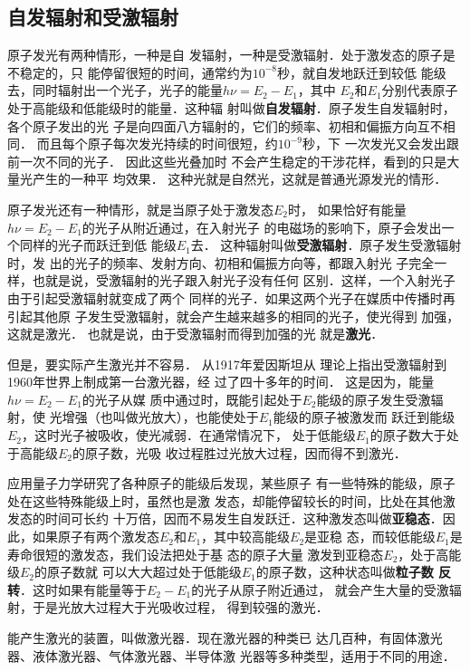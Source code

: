 \subsection{自发辐射和受激辐射}

原子发光有两种情形，一种是自
发辐射，一种是受激辐射．处于激发态的原子是不稳定的，只
能停留很短的时间，通常约为$10^{-8}$秒，就自发地跃迁到较低
能级去，同时辐射出一个光子，光子的能量$h\nu =E_2-E_1$，其中
$E_2$和$E_1$分别代表原子处于高能级和低能级时的能量．这种辐
射叫做\textbf{自发辐射}．原子发生自发辐射时，各个原子发出的光
子是向四面八方辐射的，它们的频率、初相和偏振方向互不相同．
而且每个原子每次发光持续的时间很短，约$10^{-9}$秒，下
一次发光又会发出跟前一次不同的光子．
因此这些光叠加时
不会产生稳定的干涉花样，看到的只是大量光产生的一种平
均效果．
这种光就是自然光，这就是普通光源发光的情形．

原子发光还有一种情形，就是当原子处于激发态$E_2$时，
如果恰好有能量$h\nu =E_2-E_1$的光子从附近通过，在入射光子
的电磁场的影响下，原子会发出一个同样的光子而跃迁到低
能级$E_1$去．
这种辐射叫做\textbf{受激辐射}．原子发生受激辐射时，发
出的光子的频率、发射方向、初相和偏振方向等，都跟入射光
子完全一样，也就是说，受激辐射的光子跟入射光子没有任何
区别．这样，一个入射光子由于引起受激辐射就变成了两个
同样的光子．如果这两个光子在媒质中传播时再引起其他原
子发生受激辐射，就会产生越来越多的相同的光子，使光得到
加强，这就是激光．
也就是说，由于受激辐射而得到加强的光
就是\textbf{激光}．

但是，要实际产生激光并不容易．
从1917年爱因斯坦从
理论上指出受激辐射到1960年世界上制成第一台激光器，经
过了四十多年的时间．
这是因为，能量$h\nu =E_2-E_1$的光子从媒
质中通过时，既能引起处于$E_2$能级的原子发生受激辐射，使
光增强（也叫做光放大），也能使处于$E_1$能级的原子被激发而
跃迁到能级$E_2$，这时光子被吸收，使光减弱．在通常情况下，
处于低能级$E_1$的原子数大于处于高能级$E_2$的原子数，光吸
收过程胜过光放大过程，因而得不到激光．

应用量子力学研究了各种原子的能级后发现，某些原子
有一些特殊的能级，原子处在这些特殊能级上时，虽然也是激
发态，却能停留较长的时间，比处在其他激发态的时间可长约
十万倍，因而不易发生自发跃迁．这种激发态叫做\textbf{亚稳态}．因
此，如果原子有两个激发态$E_2$和$E_1$，其中较高能级$E_2$是亚稳
态，而较低能级$E_1$是寿命很短的激发态，我们设法把处于基
态的原子大量 激发到亚稳态$E_2$，处于高能级$E_2$的原子数就
可以大大超过处于低能级$E_1$的原子数，这种状态叫做\textbf{粒子数
反转}．这时如果有能量等于$E_2-E_1$的光子从原子附近通过，
就会产生大量的受激辐射，于是光放大过程大于光吸收过程，
得到较强的激光．

能产生激光的装置，叫做激光器．现在激光器的种类已
达几百种，有固体激光器、液体激光器、气体激光器、半导体激
光器等多种类型，适用于不同的用途．

